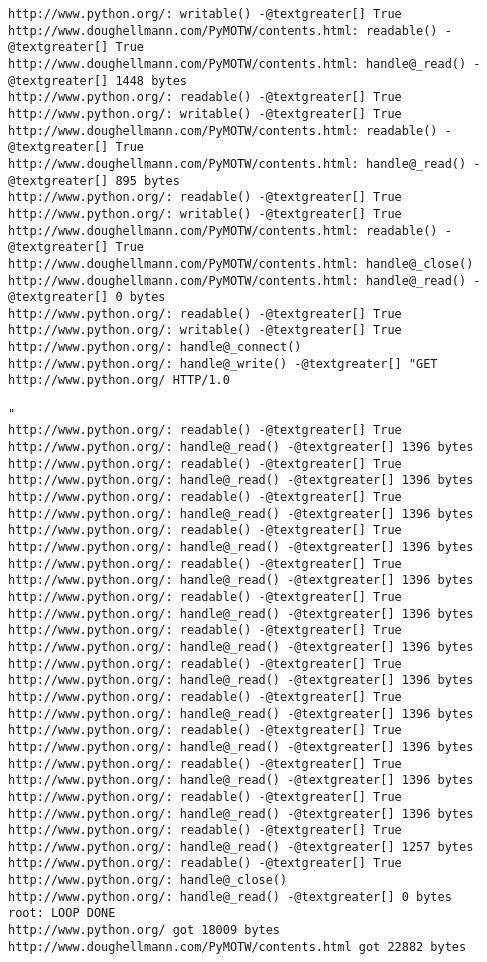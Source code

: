 \documentclass[a4paper,10pt,english]{manual}
\begin{document}
\begin{Verbatim}[commandchars=@\[\]]
http://www.python.org/: writable() -@textgreater[] True
http://www.doughellmann.com/PyMOTW/contents.html: readable() -@textgreater[] True
http://www.doughellmann.com/PyMOTW/contents.html: handle@_read() -@textgreater[] 1448 bytes
http://www.python.org/: readable() -@textgreater[] True
http://www.python.org/: writable() -@textgreater[] True
http://www.doughellmann.com/PyMOTW/contents.html: readable() -@textgreater[] True
http://www.doughellmann.com/PyMOTW/contents.html: handle@_read() -@textgreater[] 895 bytes
http://www.python.org/: readable() -@textgreater[] True
http://www.python.org/: writable() -@textgreater[] True
http://www.doughellmann.com/PyMOTW/contents.html: readable() -@textgreater[] True
http://www.doughellmann.com/PyMOTW/contents.html: handle@_close()
http://www.doughellmann.com/PyMOTW/contents.html: handle@_read() -@textgreater[] 0 bytes
http://www.python.org/: readable() -@textgreater[] True
http://www.python.org/: writable() -@textgreater[] True
http://www.python.org/: handle@_connect()
http://www.python.org/: handle@_write() -@textgreater[] "GET http://www.python.org/ HTTP/1.0

"
http://www.python.org/: readable() -@textgreater[] True
http://www.python.org/: handle@_read() -@textgreater[] 1396 bytes
http://www.python.org/: readable() -@textgreater[] True
http://www.python.org/: handle@_read() -@textgreater[] 1396 bytes
http://www.python.org/: readable() -@textgreater[] True
http://www.python.org/: handle@_read() -@textgreater[] 1396 bytes
http://www.python.org/: readable() -@textgreater[] True
http://www.python.org/: handle@_read() -@textgreater[] 1396 bytes
http://www.python.org/: readable() -@textgreater[] True
http://www.python.org/: handle@_read() -@textgreater[] 1396 bytes
http://www.python.org/: readable() -@textgreater[] True
http://www.python.org/: handle@_read() -@textgreater[] 1396 bytes
http://www.python.org/: readable() -@textgreater[] True
http://www.python.org/: handle@_read() -@textgreater[] 1396 bytes
http://www.python.org/: readable() -@textgreater[] True
http://www.python.org/: handle@_read() -@textgreater[] 1396 bytes
http://www.python.org/: readable() -@textgreater[] True
http://www.python.org/: handle@_read() -@textgreater[] 1396 bytes
http://www.python.org/: readable() -@textgreater[] True
http://www.python.org/: handle@_read() -@textgreater[] 1396 bytes
http://www.python.org/: readable() -@textgreater[] True
http://www.python.org/: handle@_read() -@textgreater[] 1396 bytes
http://www.python.org/: readable() -@textgreater[] True
http://www.python.org/: handle@_read() -@textgreater[] 1396 bytes
http://www.python.org/: readable() -@textgreater[] True
http://www.python.org/: handle@_read() -@textgreater[] 1257 bytes
http://www.python.org/: readable() -@textgreater[] True
http://www.python.org/: handle@_close()
http://www.python.org/: handle@_read() -@textgreater[] 0 bytes
root: LOOP DONE
http://www.python.org/ got 18009 bytes
http://www.doughellmann.com/PyMOTW/contents.html got 22882 bytes
\end{Verbatim}
\end{document}
